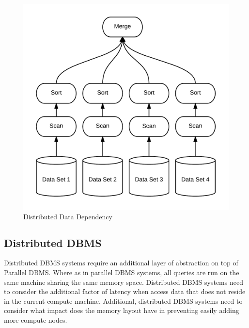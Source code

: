 \documentclass[10pt,twocolumn]{IEEEtran11}
\begin{document}
\begin{figure}[h]
\centering
\includegraphics[scale=0.12]{images/parDBMS.png}
\caption{Distributed Data Dependency}
\label{fig:disDBMS}
\end{figure}

\subsection{Distributed DBMS}

Distributed DBMS systems require an additional layer of abstraction on top of Parallel DBMS.  Where as in parallel DBMS systems, all queries are run on the same machine sharing the same memory space.  Distributed DBMS systems need to consider the additional factor of latency when access data that does not reside in the current compute machine.  Additional, distributed DBMS systems need to consider what impact does the memory layout have in preventing easily adding more compute nodes.  
\end{document}
